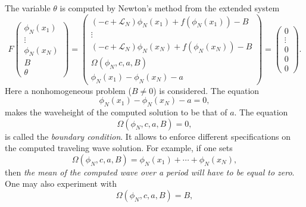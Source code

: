	The variable $\theta$ is computed by Newton's method from the extended system 
\begin{equation}
F\left(
\begin{matrix}
\phi_N(x_1)\\ \vdots \\ \phi_N(x_N) \\ B \\ \theta
\end{matrix}
 \right)= \left(
\begin{matrix}
(-c+\mathcal{L}_N)\phi_N(x_1)+ f(\phi_N(x_1)) - B
\\ \vdots 
\\ (-c+\mathcal{L}_N)\phi_N(x_N)+ f(\phi_N(x_N)) - B
\\ \Omega(\phi_N, c, a, B)
\\ \phi_N(x_1)-\phi_N(x_N)-a
\end{matrix}
 \right)=
\left(
\begin{matrix}
0
\\ \vdots 
\\ 0
\\ 0
\\ 0
\end{matrix}
 \right). \label{system-N3} 
\end{equation}
	Here a nonhomogeneous problem ($B \neq 0$) is considered.
	The equation 	
\begin{equation*}
	\phi_N(x_1)-\phi_N(x_N)-a = 0, 
\end{equation*}
	 makes the waveheight of the computed solution to be that of $a$. The equation 
\begin{equation*}
	\Omega(\phi_N, c, a, B)=0, %
\end{equation*}
	 is called the  \emph{boundary condition}. 
	It allows to enforce different specifications on the computed traveling wave solution.   	
	For example, if one sets  
\begin{equation*}
	\Omega(\phi_N, c, a, B)= \phi_N(x_1)+\cdots+\phi_N(x_N), 
\end{equation*}
	 then \emph{the mean of the computed wave over a period will have to be equal to zero}.
	One may also experiment with	
\begin{equation*}
	\Omega(\phi_N, c, a, B) = B, 
\end{equation*}
